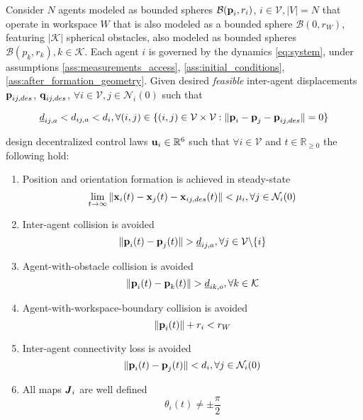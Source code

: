 \begin{bg_box}
\begin{problem}
  Consider $N$ agents modeled as bounded spheres $\mathcal{B}(\bm{\mathbf{p}}_i, r_i)$,
  $i \in \mathcal{V}, |V| = N$ that operate in workspace $W$ that is also modeled
  as a bounded sphere $\mathcal{B}(0,r_W)$, featuring $|\mathcal{K}|$ spherical obstacles,
  also modeled as bounded spheres $\mathcal{B}(p_k, r_k), k \in \mathcal{K}$.
  Each agent $i$ is governed by the dynamics \eqref{eq:system}, under assumptions
  \ref{ass:measurements_access}, \ref{ass:initial_conditions},
  \ref{ass:after_formation_geometry}. Given desired \textit{feasible}
  inter-agent displacements $\bm{\mathbf{p}}_{ij,des}$, $\bm{\mathbf{q}}_{ij,des}$,
  $\forall i \in \mathcal{V}, j \in \mathcal{N}_i(0)$ such that

  $$\underline{d}_{ij,a} < d_{ij,a} < d_i, \forall (i,j) \in
  \{(i,j) \in \mathcal{V} \times \mathcal{V}:
  \|\bm{\mathbf{p}}_i - \bm{\mathbf{p}}_j - \bm{\mathbf{p}}_{ij,des}\| = 0\}$$

  design decentralized control laws $\bm{\mathbf{u}}_i \in \mathbb{R}^6$ such that
  $\forall i \in \mathcal{V}$ and $t \in \mathbb{R}_{\geq 0}$ the following
  hold:

  \begin{enumerate}

    \item Position and orientation formation is achieved in steady-state
      $$\lim_{t \to \infty} \|\bm{\mathbf{x}}_i(t) - \bm{\mathbf{x}}_j(t) - \bm{\mathbf{x}}_{ij,des}(t)\| < \mu_i,
        \forall j \in \mathcal{N}_i(0)$$

    \item Inter-agent collision is avoided
      $$\|\bm{\mathbf{p}}_i(t) - \bm{\mathbf{p}}_j(t)\| > \underline{d}_{ij,a},
      \forall j \in \mathcal{V} \backslash \{i\}$$

    \item Agent-with-obstacle collision is avoided
      $$\|\bm{\mathbf{p}}_i(t) - \bm{\mathbf{p}}_k(t)\| > \underline{d}_{ik,o},
      \forall k \in \mathcal{K}$$

    \item Agent-with-workspace-boundary collision is avoided
      $$\|\bm{\mathbf{p}}_i(t)\| + r_i < r_W$$

    \item Inter-agent connectivity loss is avoided
      $$\|\bm{\mathbf{p}}_i(t) - \bm{\mathbf{p}}_j(t)\| < d_i,
      \forall j \in \mathcal{N}_i(0)$$

    \item All maps $\bm{\mathit{J}}_i$ are well defined
      $$\theta_i(t) \ne \pm \frac{\pi}{2}$$

  \end{enumerate}
\label{problem}
\end{problem}
\end{bg_box}
